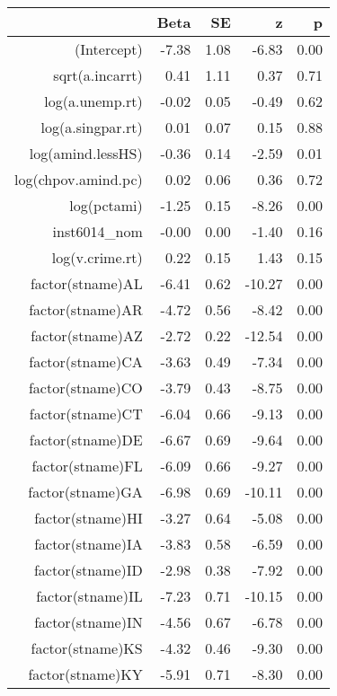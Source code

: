 \begin{table}[ht]
\centering
\begin{tabular}{rrrrr}
  \hline
 & Beta & SE & z & p \\ 
  \hline
(Intercept) & -7.38 & 1.08 & -6.83 & 0.00 \\ 
  sqrt(a.incarrt) & 0.41 & 1.11 & 0.37 & 0.71 \\ 
  log(a.unemp.rt) & -0.02 & 0.05 & -0.49 & 0.62 \\ 
  log(a.singpar.rt) & 0.01 & 0.07 & 0.15 & 0.88 \\ 
  log(amind.lessHS) & -0.36 & 0.14 & -2.59 & 0.01 \\ 
  log(chpov.amind.pc) & 0.02 & 0.06 & 0.36 & 0.72 \\ 
  log(pctami) & -1.25 & 0.15 & -8.26 & 0.00 \\ 
  inst6014\_nom & -0.00 & 0.00 & -1.40 & 0.16 \\ 
  log(v.crime.rt) & 0.22 & 0.15 & 1.43 & 0.15 \\ 
  factor(stname)AL & -6.41 & 0.62 & -10.27 & 0.00 \\ 
  factor(stname)AR & -4.72 & 0.56 & -8.42 & 0.00 \\ 
  factor(stname)AZ & -2.72 & 0.22 & -12.54 & 0.00 \\ 
  factor(stname)CA & -3.63 & 0.49 & -7.34 & 0.00 \\ 
  factor(stname)CO & -3.79 & 0.43 & -8.75 & 0.00 \\ 
  factor(stname)CT & -6.04 & 0.66 & -9.13 & 0.00 \\ 
  factor(stname)DE & -6.67 & 0.69 & -9.64 & 0.00 \\ 
  factor(stname)FL & -6.09 & 0.66 & -9.27 & 0.00 \\ 
  factor(stname)GA & -6.98 & 0.69 & -10.11 & 0.00 \\ 
  factor(stname)HI & -3.27 & 0.64 & -5.08 & 0.00 \\ 
  factor(stname)IA & -3.83 & 0.58 & -6.59 & 0.00 \\ 
  factor(stname)ID & -2.98 & 0.38 & -7.92 & 0.00 \\ 
  factor(stname)IL & -7.23 & 0.71 & -10.15 & 0.00 \\ 
  factor(stname)IN & -4.56 & 0.67 & -6.78 & 0.00 \\ 
  factor(stname)KS & -4.32 & 0.46 & -9.30 & 0.00 \\ 
  factor(stname)KY & -5.91 & 0.71 & -8.30 & 0.00 \\ 

\end{tabular}
\end{table}
